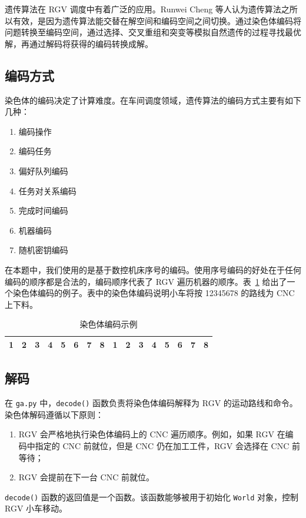 \documentclass{cumcmthesis}
\begin{document}
	遗传算法在 RGV 调度中有着广泛的应用。Runwei Cheng 等人认为\cite{chenrunwei}遗传算法之所以有效，是因为遗传算法能交替在解空间和编码空间之间切换。通过染色体编码将问题转换至编码空间，通过选择、交叉重组和突变等模拟自然遗传的过程寻找最优解，再通过解码将获得的编码转换成解。

	\subsection{编码方式}

	染色体的编码决定了计算难度。在车间调度领域，遗传算法的编码方式主要有如下几种：
	\begin{enumerate}
		\item 编码操作
		\item 编码任务
		\item 偏好队列编码
		\item 任务对关系编码
		\item 完成时间编码
		\item 机器编码
		\item 随机密钥编码
	\end{enumerate}
	在本题中，我们使用的是基于数控机床序号的编码。使用序号编码的好处在于任何编码的顺序都是合法的，编码顺序代表了 RGV 遍历机器的顺序。表~\ref{table:chromosome} 给出了一个染色体编码的例子。表中的染色体编码说明小车将按 12345678 的路线为 CNC 上下料。
	
	\begin{table}[!htbp]
		\centering
		\caption{染色体编码示例}
		\label{table:chromosome}
		\begin{tabular}{cccccccccccccccc}
	\toprule[1.5pt]
            1 & 2 & 3 & 4 & 5 & 6 & 7 & 8 & 1 & 2 & 3 & 4 & 5 & 6 & 7 & 8 \\
	\bottomrule[1.5pt]
	\end{tabular}
	\end{table}
	
	\subsection{解码}

	在 \texttt{ga.py} 中，\texttt{decode()} 函数负责将染色体编码解释为 RGV 的运动路线和命令。染色体解码遵循以下原则：
	\begin{enumerate}
		\item RGV 会严格地执行染色体编码上的 CNC 遍历顺序。例如，如果 RGV 在编码中指定的 CNC 前就位，但是 CNC 仍在加工工件，RGV 会选择在 CNC 前等待；
		\item RGV 会提前在下一台 CNC 前就位。
	\end{enumerate}
	\texttt{decode()} 函数的返回值是一个函数。该函数能够被用于初始化 \texttt{World} 对象，控制 RGV 小车移动。
\end{document}
